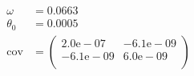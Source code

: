 \begin{align}
	\omega &= 0.0663 \\
	\theta_0 &= 0.0005 \\
	\mathrm{cov} &=
	\begin{pmatrix}
		2.0\mathrm{e}-07 &-6.1\mathrm{e}-09 \\
		-6.1\mathrm{e}-09 &6.0\mathrm{e}-09 \\
	\end{pmatrix} 
\end{align}

